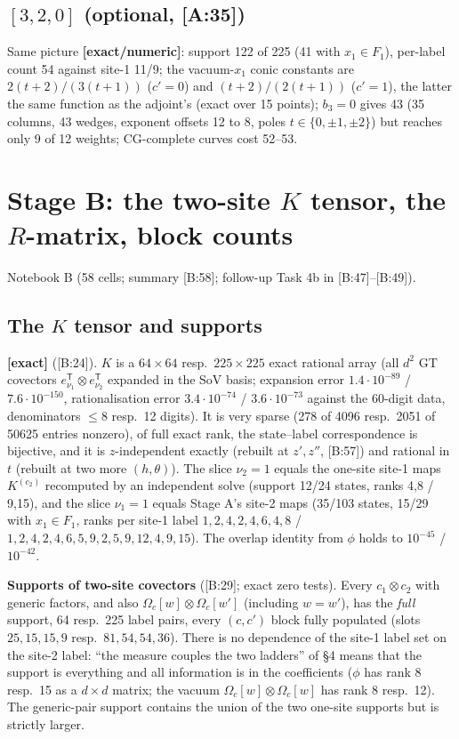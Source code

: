 \documentclass[10pt]{article}
\newcommand{\nb}[1]{\texttt{\path{#1}}}
\newcommand{\cl}[2]{\textsf{[#1:#2]}}
\newcommand{\tg}[1]{\textbf{[#1]}}
\newcommand{\Om}{\Omega}
\begin{document}
\subsection{$[3,2,0]$ (optional, \cl{A}{35})}\label{sec:A320}

Same picture \tg{exact/numeric}: support 122 of 225 (41 with $x_1\in F_1$), per-label count 54 against site-1 11/9; the vacuum-$x_1$ conic constants are $2(t+2)/(3(t+1))$ ($c'=0$) and $(t+2)/(2(t+1))$ ($c'=1$), the latter the same function as the adjoint's (exact over 15 points); $b_3=0$ gives 43 (35 columns, 43 wedges, exponent offsets 12 to 8, poles $t\in\{0,\pm1,\pm2\}$) but reaches only 9 of 12 weights; CG-complete curves cost 52--53.

\section{Stage B: the two-site $K$ tensor, the $R$-matrix, block counts}\label{sec:B}

Notebook B (58 cells; summary \cl{B}{58}; follow-up Task 4b in \cl{B}{47}--\cl{B}{49}).

\subsection{The $K$ tensor and supports}\label{sec:BK}

\tg{exact} (\cl{B}{24}). $K$ is a $64\times64$ resp.\ $225\times225$ exact rational array (all $d^2$ GT covectors $e_{\nu_1}^{\mathsf T}\otimes e_{\nu_2}^{\mathsf T}$ expanded in the SoV basis; expansion error $1.4\cdot10^{-89}$ / $7.6\cdot10^{-150}$, rationalisation error $3.4\cdot10^{-74}$ / $3.6\cdot10^{-73}$ against the 60-digit data, denominators $\le8$ resp.\ 12 digits). It is very sparse (278 of 4096 resp.\ 2051 of 50625 entries nonzero), of full exact rank, the state--label correspondence is bijective, and it is $z$-independent exactly (rebuilt at $z',z''$, \cl{B}{57}) and rational in $t$ (rebuilt at two more $(h,\theta)$). The slice $\nu_2=1$ equals the one-site site-1 maps $K^{(c_2)}$ recomputed by an independent solve (support 12/24 states, ranks 4,8 / 9,15), and the slice $\nu_1=1$ equals Stage A's site-2 maps (35/103 states, 15/29 with $x_1\in F_1$, ranks per site-1 label $1,2,4,2,4,6,4,8$ / $1,2,4,2,4,6,5,9,2,5,9,12,4,9,15$). The overlap identity from $\phi$ holds to $10^{-45}$ / $10^{-42}$.

\textbf{Supports of two-site covectors} (\cl{B}{29}; exact zero tests). Every $c_1\otimes c_2$ with generic factors, and also $\Om_c[w]\otimes\Om_c[w']$ (including $w=w'$), has the \emph{full} support, 64 resp.\ 225 label pairs, every $(c,c')$ block fully populated (slots $25,15,15,9$ resp.\ $81,54,54,36$). There is no dependence of the site-1 label set on the site-2 label: ``the measure couples the two ladders'' of \nb{Two-rotations-det-overlap.md} \S4 means that the support is everything and all information is in the coefficients ($\phi$ has rank 8 resp.\ 15 as a $d\times d$ matrix; the vacuum $\Om_c[w]\otimes\Om_c[w]$ has rank 8 resp.\ 12). The generic-pair support contains the union of the two one-site supports but is strictly larger.
\end{document}
